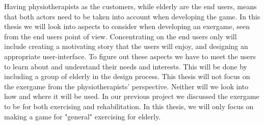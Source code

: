 Having physiotherapists as the customers, while elderly are the end users, means that both actors need to be taken into account when developing the game. In this thesis we will look into aspects to consider when developing an exergame, seen from the end users point of view. Concentrating on the end users only will include creating a motivating story that the users will enjoy, and designing an appropriate user-interface. To figure out these aspects we have to meet the users to learn about and understand their needs and interests. This will be done by including a group of elderly in the design process. This thesis will not focus on the exergame from the physiotherapists' perspective. Neither will we look into how and where it will be used. In our previous project we discussed the exergame to be for both exercising and rehabilitation. In this thesis, we will only focus on making a game for "general" exercising for elderly. 

